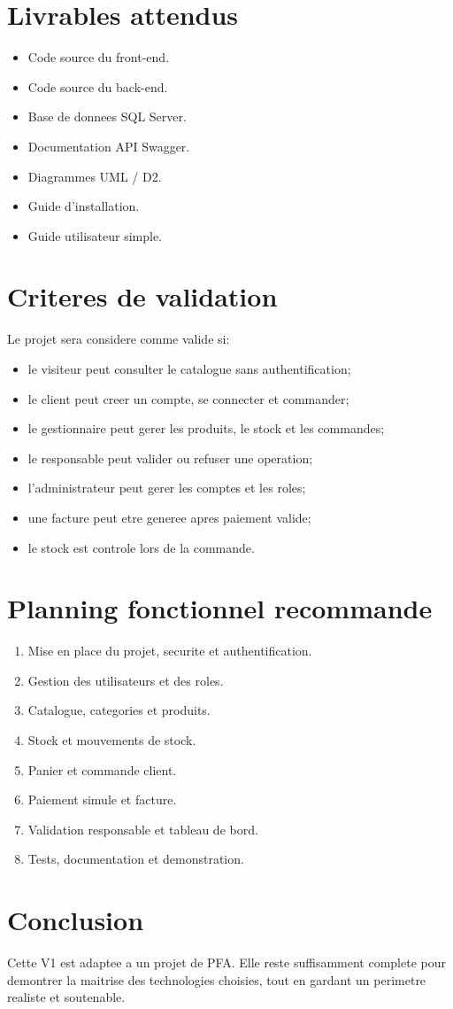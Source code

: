 \documentclass[12pt,a4paper]{article}
\begin{document}
\section{Livrables attendus}
\begin{itemize}
  \item Code source du front-end.
  \item Code source du back-end.
  \item Base de donnees SQL Server.
  \item Documentation API Swagger.
  \item Diagrammes UML / D2.
  \item Guide d'installation.
  \item Guide utilisateur simple.
\end{itemize}

\section{Criteres de validation}
Le projet sera considere comme valide si:
\begin{itemize}
  \item le visiteur peut consulter le catalogue sans authentification;
  \item le client peut creer un compte, se connecter et commander;
  \item le gestionnaire peut gerer les produits, le stock et les commandes;
  \item le responsable peut valider ou refuser une operation;
  \item l'administrateur peut gerer les comptes et les roles;
  \item une facture peut etre generee apres paiement valide;
  \item le stock est controle lors de la commande.
\end{itemize}

\section{Planning fonctionnel recommande}
\begin{enumerate}
  \item Mise en place du projet, securite et authentification.
  \item Gestion des utilisateurs et des roles.
  \item Catalogue, categories et produits.
  \item Stock et mouvements de stock.
  \item Panier et commande client.
  \item Paiement simule et facture.
  \item Validation responsable et tableau de bord.
  \item Tests, documentation et demonstration.
\end{enumerate}

\section{Conclusion}
Cette V1 est adaptee a un projet de PFA. Elle reste suffisamment complete pour demontrer la maitrise des technologies choisies, tout en gardant un perimetre realiste et soutenable.
\end{document}
